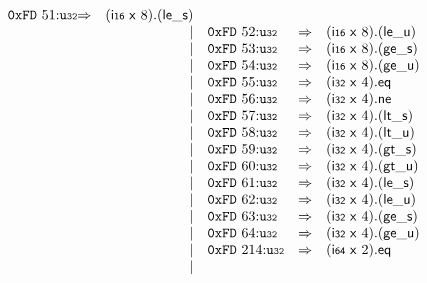 $$\begin{array}{@{}l@{}rrlll@{}l@{}}
\mathtt{0xFD}~51{:}{\mathtt{u{\scriptstyle32}}} &\Rightarrow& (\mathsf{i{\scriptstyle16}}~\mathsf{x}~8) . ({\mathsf{le\_}}{\mathsf{s}}) \\ &&|&
\mathtt{0xFD}~52{:}{\mathtt{u{\scriptstyle32}}} &\Rightarrow& (\mathsf{i{\scriptstyle16}}~\mathsf{x}~8) . ({\mathsf{le\_}}{\mathsf{u}}) \\ &&|&
\mathtt{0xFD}~53{:}{\mathtt{u{\scriptstyle32}}} &\Rightarrow& (\mathsf{i{\scriptstyle16}}~\mathsf{x}~8) . ({\mathsf{ge\_}}{\mathsf{s}}) \\ &&|&
\mathtt{0xFD}~54{:}{\mathtt{u{\scriptstyle32}}} &\Rightarrow& (\mathsf{i{\scriptstyle16}}~\mathsf{x}~8) . ({\mathsf{ge\_}}{\mathsf{u}}) \\ &&|&
\mathtt{0xFD}~55{:}{\mathtt{u{\scriptstyle32}}} &\Rightarrow& (\mathsf{i{\scriptstyle32}}~\mathsf{x}~4) . \mathsf{eq} \\ &&|&
\mathtt{0xFD}~56{:}{\mathtt{u{\scriptstyle32}}} &\Rightarrow& (\mathsf{i{\scriptstyle32}}~\mathsf{x}~4) . \mathsf{ne} \\ &&|&
\mathtt{0xFD}~57{:}{\mathtt{u{\scriptstyle32}}} &\Rightarrow& (\mathsf{i{\scriptstyle32}}~\mathsf{x}~4) . ({\mathsf{lt\_}}{\mathsf{s}}) \\ &&|&
\mathtt{0xFD}~58{:}{\mathtt{u{\scriptstyle32}}} &\Rightarrow& (\mathsf{i{\scriptstyle32}}~\mathsf{x}~4) . ({\mathsf{lt\_}}{\mathsf{u}}) \\ &&|&
\mathtt{0xFD}~59{:}{\mathtt{u{\scriptstyle32}}} &\Rightarrow& (\mathsf{i{\scriptstyle32}}~\mathsf{x}~4) . ({\mathsf{gt\_}}{\mathsf{s}}) \\ &&|&
\mathtt{0xFD}~60{:}{\mathtt{u{\scriptstyle32}}} &\Rightarrow& (\mathsf{i{\scriptstyle32}}~\mathsf{x}~4) . ({\mathsf{gt\_}}{\mathsf{u}}) \\ &&|&
\mathtt{0xFD}~61{:}{\mathtt{u{\scriptstyle32}}} &\Rightarrow& (\mathsf{i{\scriptstyle32}}~\mathsf{x}~4) . ({\mathsf{le\_}}{\mathsf{s}}) \\ &&|&
\mathtt{0xFD}~62{:}{\mathtt{u{\scriptstyle32}}} &\Rightarrow& (\mathsf{i{\scriptstyle32}}~\mathsf{x}~4) . ({\mathsf{le\_}}{\mathsf{u}}) \\ &&|&
\mathtt{0xFD}~63{:}{\mathtt{u{\scriptstyle32}}} &\Rightarrow& (\mathsf{i{\scriptstyle32}}~\mathsf{x}~4) . ({\mathsf{ge\_}}{\mathsf{s}}) \\ &&|&
\mathtt{0xFD}~64{:}{\mathtt{u{\scriptstyle32}}} &\Rightarrow& (\mathsf{i{\scriptstyle32}}~\mathsf{x}~4) . ({\mathsf{ge\_}}{\mathsf{u}}) \\ &&|&
\mathtt{0xFD}~214{:}{\mathtt{u{\scriptstyle32}}} &\Rightarrow& (\mathsf{i{\scriptstyle64}}~\mathsf{x}~2) . \mathsf{eq} \\ &&|&

\end{array}$$
